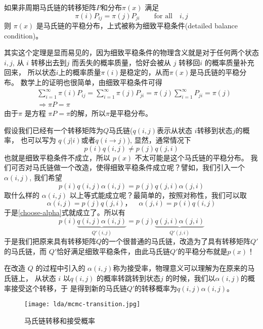 \begin{theorem}[细致平稳条件]
如果非周期马氏链的转移矩阵$P$和分布$\pi(x)$ 满足
\begin{equation}
\pi(i)P_{ij} = \pi(j)P_{ji} \quad\quad \text{for all} \quad i,j
\end{equation}
则 $\pi(x)$ 是马氏链的平稳分布，上式被称为细致平稳条件(detailed balance condition)。
\end{theorem}

其实这个定理是显而易见的，因为细致平稳条件的物理含义就是对于任何两个状态$i,j$,
从 $i$ 转移出去到$j$ 而丢失的概率质量，恰好会被从 $j$ 转移回$i$ 的概率质量补充回来，
所以状态$i$上的概率质量$\pi(i)$是稳定的，从而$\pi(x)$是马氏链的平稳分布。
数学上的证明也很简单，由细致平稳条件可得
\begin{align*}
& \sum_{i=1}^\infty \pi(i)P_{ij} = \sum_{i=1}^\infty \pi(j)P_{ji}
= \pi(j) \sum_{i=1}^\infty P_{ji} = \pi(j) \\
& \Rightarrow \pi P = \pi
\end{align*}
由于$\pi$ 是方程 $\pi P = \pi$的解，所以$\pi$是平稳分布。


假设我们已经有一个转移矩阵为$Q$马氏链($q(i,j)$表示从状态 $i$转移到状态$j$的概率，
也可以写为 $q(j|i)$或者$q(i\rightarrow j)$),
显然，通常情况下
$$ p(i) q(i,j) \neq p(j) q(j,i) $$
也就是细致平稳条件不成立，所以 $p(x)$ 不太可能是这个马氏链的平稳分布。
我们可否对马氏链做一个改造，使得细致平稳条件成立呢？譬如，我们引入一个 $\alpha(i,j)$,
我们希望
\begin{equation}
\label{choose-alpha}
 p(i) q(i,j)\alpha(i,j) = p(j) q(j,i)\alpha(j,i)
\end{equation}
取什么样的 $\alpha(i,j)$ 以上等式能成立呢？最简单的，按照对称性，我们可以取
$$ \alpha(i,j)= p(j) q(j,i)， \quad \alpha(j,i) = p(i) q(i,j)$$
于是\eqref{choose-alpha}式就成立了。所以有
\begin{equation}
\label{detailed-balance}
p(i) \underbrace{q(i,j)\alpha(i,j)}_{Q'(i,j)}
= p(j) \underbrace{q(j,i)\alpha(j,i)}_{Q'(j,i)}
\end{equation}
于是我们把原来具有转移矩阵$Q$的一个很普通的马氏链，改造为了具有转移矩阵$Q'$的马氏链，而
$Q'$恰好满足细致平稳条件，由此马氏链$Q'$的平稳分布就是$p(x)$！

在改造 $Q$ 的过程中引入的 $\alpha(i,j)$称为接受率，物理意义可以理解为在原来的马氏链上，
从状态 $i$ 以$q(i,j)$ 的概率转跳转到状态$j$ 的时候，我们以$\alpha(i,j)$的概率接受这个转移，于
是得到新的马氏链$Q'$的转移概率为$q(i,j)\alpha(i,j)$。

\begin{figure}[htbp]
\centering
\texttt{[image: lda/mcmc-transition.jpg]}
\caption{马氏链转移和接受概率}
\end{figure}

